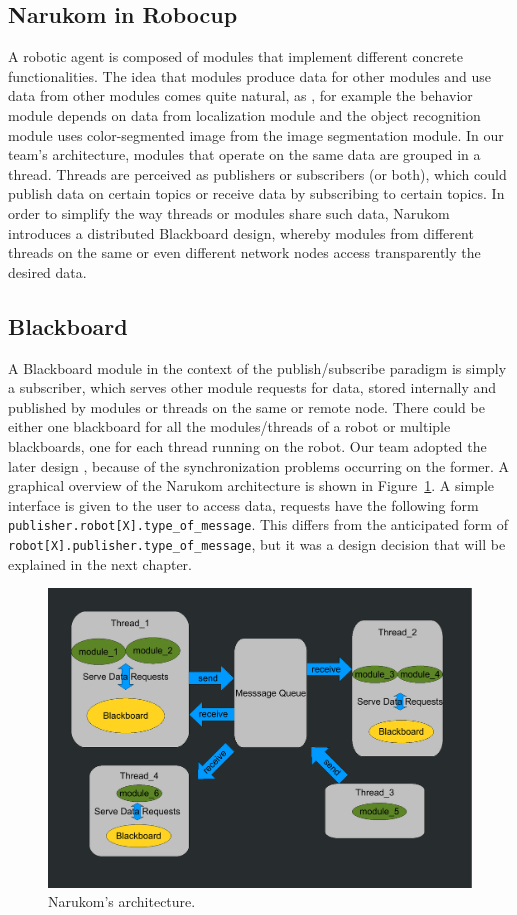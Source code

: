\subsection{Narukom in Robocup}

A robotic agent is composed of modules that implement different concrete functionalities. The idea that modules produce data for other modules and use data from other modules comes quite natural, as , for example the behavior module depends on data from localization module and the object recognition module uses  color-segmented image from the image segmentation module. In our team's architecture, modules that operate on the same data are grouped in a thread. Threads are perceived as publishers or subscribers (or both), which could publish data on certain topics or receive  data by subscribing to certain topics. In order to simplify the way threads or modules share such data, Narukom introduces a distributed Blackboard design, whereby modules from different threads on the same or even different network nodes access transparently the desired data. 

\subsection{Blackboard}

A Blackboard module  in the context of the publish/subscribe paradigm is simply a subscriber, which  serves other module requests for data, stored internally and published by modules or threads on the same or remote node. There could be either one blackboard for all the modules/threads of a robot or multiple blackboards, one for each thread running on the robot. Our team adopted the later design , because of the synchronization problems occurring on the former. A graphical overview of the Narukom architecture is shown in Figure~\ref{fig:Narukom-architecture}. A simple interface is given to the user to access data, requests have the following form {\tt publisher.robot[X].type\_of\_message}. This differs from the anticipated form of {\tt robot[X].publisher.type\_of\_message}, but it was a design decision that will be explained in the next chapter.

\begin{figure}[t]
\centering
  \includegraphics[width=0.6\columnwidth]{Chapter3/figures/new_architecture.pdf}
  \caption{Narukom's architecture.} 
  \label{fig:Narukom-architecture}
\end{figure}


